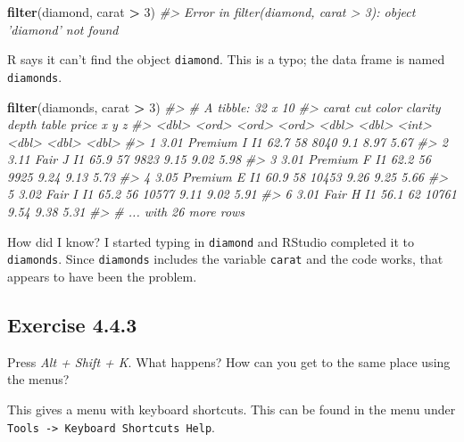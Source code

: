 \documentclass[]{book}
\newenvironment{Shaded}{\begin{snugshade}}{\end{snugshade}}
\newcommand{\CommentTok}[1]{\textcolor[rgb]{0.56,0.35,0.01}{\textit{#1}}}
\newcommand{\DecValTok}[1]{\textcolor[rgb]{0.00,0.00,0.81}{#1}}
\newcommand{\KeywordTok}[1]{\textcolor[rgb]{0.13,0.29,0.53}{\textbf{#1}}}
\newcommand{\NormalTok}[1]{#1}
\newcommand{\OperatorTok}[1]{\textcolor[rgb]{0.81,0.36,0.00}{\textbf{#1}}}
\newcommand{\StringTok}[1]{\textcolor[rgb]{0.31,0.60,0.02}{#1}}
\theoremstyle{plain}
\theoremstyle{remark}
\begin{document}
\begin{Shaded}
\begin{Highlighting}[]
\KeywordTok{filter}\NormalTok{(diamond, carat }\OperatorTok{>}\StringTok{ }\DecValTok{3}\NormalTok{)}
\CommentTok{#> Error in filter(diamond, carat > 3): object 'diamond' not found}
\end{Highlighting}
\end{Shaded}

R says it can't find the object \texttt{diamond}.
This is a typo; the data frame is named \texttt{diamonds}.

\begin{Shaded}
\begin{Highlighting}[]
\KeywordTok{filter}\NormalTok{(diamonds, carat }\OperatorTok{>}\StringTok{ }\DecValTok{3}\NormalTok{)}
\CommentTok{#> # A tibble: 32 x 10}
\CommentTok{#>   carat cut     color clarity depth table price     x     y     z}
\CommentTok{#>   <dbl> <ord>   <ord> <ord>   <dbl> <dbl> <int> <dbl> <dbl> <dbl>}
\CommentTok{#> 1  3.01 Premium I     I1       62.7    58  8040  9.1   8.97  5.67}
\CommentTok{#> 2  3.11 Fair    J     I1       65.9    57  9823  9.15  9.02  5.98}
\CommentTok{#> 3  3.01 Premium F     I1       62.2    56  9925  9.24  9.13  5.73}
\CommentTok{#> 4  3.05 Premium E     I1       60.9    58 10453  9.26  9.25  5.66}
\CommentTok{#> 5  3.02 Fair    I     I1       65.2    56 10577  9.11  9.02  5.91}
\CommentTok{#> 6  3.01 Fair    H     I1       56.1    62 10761  9.54  9.38  5.31}
\CommentTok{#> # ... with 26 more rows}
\end{Highlighting}
\end{Shaded}

How did I know? I started typing in \texttt{diamond} and RStudio completed it to \texttt{diamonds}.
Since \texttt{diamonds} includes the variable \texttt{carat} and the code works, that appears to have been the problem.

\hypertarget{exercise-4.4.3}{%
\subsection*{\texorpdfstring{Exercise {4.4.3}}{Exercise 4.4.3}}\label{exercise-4.4.3}}

Press \emph{Alt + Shift + K}. What happens? How can you get to the same place using the menus?

This gives a menu with keyboard shortcuts. This can be found in the menu under \texttt{Tools\ -\textgreater{}\ Keyboard\ Shortcuts\ Help}.
\end{document}
